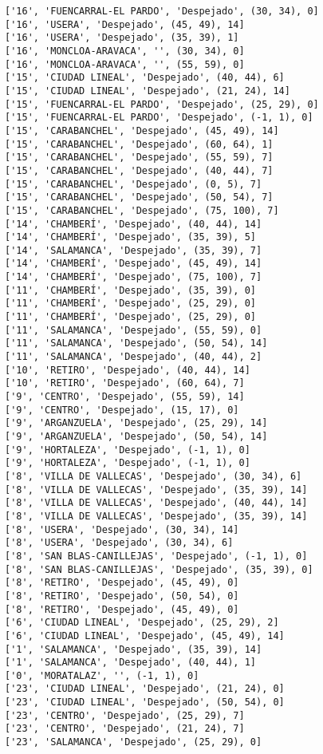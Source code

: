 \documentclass[11pt]{article}
\begin{document}
\begin{Verbatim}[commandchars=\\\{\}]
['16', 'FUENCARRAL-EL PARDO', 'Despejado', (30, 34), 0]
['16', 'USERA', 'Despejado', (45, 49), 14]
['16', 'USERA', 'Despejado', (35, 39), 1]
['16', 'MONCLOA-ARAVACA', '', (30, 34), 0]
['16', 'MONCLOA-ARAVACA', '', (55, 59), 0]
['15', 'CIUDAD LINEAL', 'Despejado', (40, 44), 6]
['15', 'CIUDAD LINEAL', 'Despejado', (21, 24), 14]
['15', 'FUENCARRAL-EL PARDO', 'Despejado', (25, 29), 0]
['15', 'FUENCARRAL-EL PARDO', 'Despejado', (-1, 1), 0]
['15', 'CARABANCHEL', 'Despejado', (45, 49), 14]
['15', 'CARABANCHEL', 'Despejado', (60, 64), 1]
['15', 'CARABANCHEL', 'Despejado', (55, 59), 7]
['15', 'CARABANCHEL', 'Despejado', (40, 44), 7]
['15', 'CARABANCHEL', 'Despejado', (0, 5), 7]
['15', 'CARABANCHEL', 'Despejado', (50, 54), 7]
['15', 'CARABANCHEL', 'Despejado', (75, 100), 7]
['14', 'CHAMBERÍ', 'Despejado', (40, 44), 14]
['14', 'CHAMBERÍ', 'Despejado', (35, 39), 5]
['14', 'SALAMANCA', 'Despejado', (35, 39), 7]
['14', 'CHAMBERÍ', 'Despejado', (45, 49), 14]
['14', 'CHAMBERÍ', 'Despejado', (75, 100), 7]
['11', 'CHAMBERÍ', 'Despejado', (35, 39), 0]
['11', 'CHAMBERÍ', 'Despejado', (25, 29), 0]
['11', 'CHAMBERÍ', 'Despejado', (25, 29), 0]
['11', 'SALAMANCA', 'Despejado', (55, 59), 0]
['11', 'SALAMANCA', 'Despejado', (50, 54), 14]
['11', 'SALAMANCA', 'Despejado', (40, 44), 2]
['10', 'RETIRO', 'Despejado', (40, 44), 14]
['10', 'RETIRO', 'Despejado', (60, 64), 7]
['9', 'CENTRO', 'Despejado', (55, 59), 14]
['9', 'CENTRO', 'Despejado', (15, 17), 0]
['9', 'ARGANZUELA', 'Despejado', (25, 29), 14]
['9', 'ARGANZUELA', 'Despejado', (50, 54), 14]
['9', 'HORTALEZA', 'Despejado', (-1, 1), 0]
['9', 'HORTALEZA', 'Despejado', (-1, 1), 0]
['8', 'VILLA DE VALLECAS', 'Despejado', (30, 34), 6]
['8', 'VILLA DE VALLECAS', 'Despejado', (35, 39), 14]
['8', 'VILLA DE VALLECAS', 'Despejado', (40, 44), 14]
['8', 'VILLA DE VALLECAS', 'Despejado', (35, 39), 14]
['8', 'USERA', 'Despejado', (30, 34), 14]
['8', 'USERA', 'Despejado', (30, 34), 6]
['8', 'SAN BLAS-CANILLEJAS', 'Despejado', (-1, 1), 0]
['8', 'SAN BLAS-CANILLEJAS', 'Despejado', (35, 39), 0]
['8', 'RETIRO', 'Despejado', (45, 49), 0]
['8', 'RETIRO', 'Despejado', (50, 54), 0]
['8', 'RETIRO', 'Despejado', (45, 49), 0]
['6', 'CIUDAD LINEAL', 'Despejado', (25, 29), 2]
['6', 'CIUDAD LINEAL', 'Despejado', (45, 49), 14]
['1', 'SALAMANCA', 'Despejado', (35, 39), 14]
['1', 'SALAMANCA', 'Despejado', (40, 44), 1]
['0', 'MORATALAZ', '', (-1, 1), 0]
['23', 'CIUDAD LINEAL', 'Despejado', (21, 24), 0]
['23', 'CIUDAD LINEAL', 'Despejado', (50, 54), 0]
['23', 'CENTRO', 'Despejado', (25, 29), 7]
['23', 'CENTRO', 'Despejado', (21, 24), 7]
['23', 'SALAMANCA', 'Despejado', (25, 29), 0]

\end{Verbatim}
\end{document}
